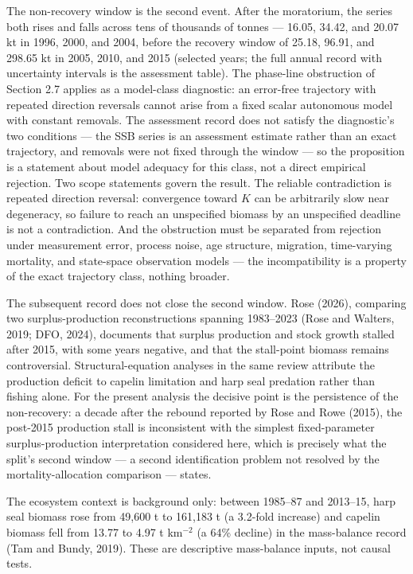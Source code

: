 \documentclass[11pt]{article}
\begin{document}
The non-recovery window is the second event. After the moratorium, the
series both rises and falls across tens of thousands of tonnes ---
16.05, 34.42, and 20.07 kt in 1996, 2000, and 2004, before the recovery
window of 25.18, 96.91, and 298.65 kt in 2005, 2010, and 2015 (selected
years; the full annual record with uncertainty intervals is the
assessment table). The phase-line obstruction of Section 2.7 applies as
a model-class diagnostic: an error-free trajectory with repeated
direction reversals cannot arise from a fixed scalar autonomous model
with constant removals. The assessment record does not satisfy the
diagnostic's two conditions --- the SSB series is an assessment estimate
rather than an exact trajectory, and removals were not fixed through the
window --- so the proposition is a statement about model adequacy for
this class, not a direct empirical rejection. Two scope statements
govern the result. The reliable contradiction is repeated direction
reversal: convergence toward \(K\) can be arbitrarily slow near
degeneracy, so failure to reach an unspecified biomass by an unspecified
deadline is not a contradiction. And the obstruction must be separated
from rejection under measurement error, process noise, age structure,
migration, time-varying mortality, and state-space observation models
--- the incompatibility is a property of the exact trajectory class,
nothing broader.

The subsequent record does not close the second window. Rose (2026),
comparing two surplus-production reconstructions spanning 1983--2023
(Rose and Walters, 2019; DFO, 2024), documents that surplus production
and stock growth stalled after 2015, with some years negative, and that
the stall-point biomass remains controversial. Structural-equation
analyses in the same review attribute the production deficit to capelin
limitation and harp seal predation rather than fishing alone. For the
present analysis the decisive point is the persistence of the
non-recovery: a decade after the rebound reported by Rose and Rowe
(2015), the post-2015 production stall is inconsistent with the simplest
fixed-parameter surplus-production interpretation considered here, which
is precisely what the split's second window --- a second identification
problem not resolved by the mortality-allocation comparison --- states.

The ecosystem context is background only: between 1985--87 and 2013--15,
harp seal biomass rose from 49,600 t to 161,183 t (a 3.2-fold increase)
and capelin biomass fell from 13.77 to 4.97 t km\(^{-2}\) (a 64\%
decline) in the mass-balance record (Tam and Bundy, 2019). These are
descriptive mass-balance inputs, not causal tests.
\end{document}
